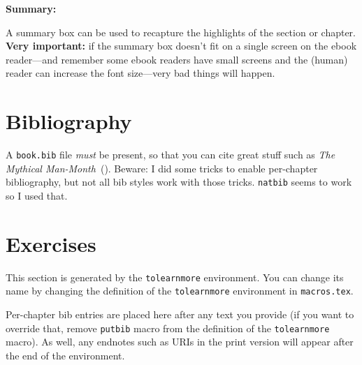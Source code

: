 \begin{summary}
  \textbf{Summary:}

  A summary box can be used to recapture the highlights of the section
  or chapter.  \textbf{Very important:} if the summary box doesn't fit
  on a single screen on the ebook reader---and remember some ebook
  readers have small screens and the (human) reader can increase the
  font size---very bad things will happen.
\end{summary}

\section{Bibliography}

A \texttt{book.bib} file \emph{must} be present, so that you can cite
great stuff such as \emph{The Mythical
  Man-Month}~(\cite{brooks:manmonth}).  Beware: I did some tricks to
enable per-chapter bibliography, but not all bib styles work with those
tricks.  \texttt{natbib} seems to work so I used that.

\section{Exercises}



\begin{tolearnmore}

This section is generated by the \texttt{tolearnmore} environment.
You can change its name by changing the definition of the
\texttt{tolearnmore} environment in \texttt{macros.tex}.

Per-chapter bib entries are placed here after any text you provide (if
you want to override that, remove \texttt{putbib} macro from the
definition of the \texttt{tolearnmore} macro).  As well, any endnotes
such as URIs in the print version will appear after the end of the
environment. 

\end{tolearnmore}
